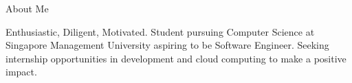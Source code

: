 \documentclass{resume} %
\begin{document}
\vspace{-1.25em}
\begin{rSection}{About Me}

Enthusiastic, Diligent, Motivated. Student pursuing Computer Science at Singapore Management University aspiring to be Software Engineer. Seeking internship opportunities in development and cloud computing to make a positive impact.

\end{rSection}

\vspace{-0.25em}
\end{document}
